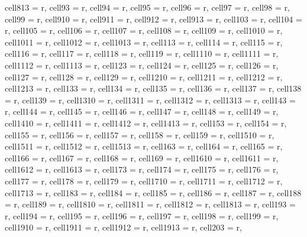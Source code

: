 \documentclass[journal]{IEEEtran}
\begin{document}
\begin{table}
\begin{adjustbox}{width=\textwidth}
\begin{tblr}
{  cell{8}{13} = {r},
  cell{9}{3} = {r},
  cell{9}{4} = {r},
  cell{9}{5} = {r},
  cell{9}{6} = {r},
  cell{9}{7} = {r},
  cell{9}{8} = {r},
  cell{9}{9} = {r},
  cell{9}{10} = {r},
  cell{9}{11} = {r},
  cell{9}{12} = {r},
  cell{9}{13} = {r},
  cell{10}{3} = {r},
  cell{10}{4} = {r},
  cell{10}{5} = {r},
  cell{10}{6} = {r},
  cell{10}{7} = {r},
  cell{10}{8} = {r},
  cell{10}{9} = {r},
  cell{10}{10} = {r},
  cell{10}{11} = {r},
  cell{10}{12} = {r},
  cell{10}{13} = {r},
  cell{11}{3} = {r},
  cell{11}{4} = {r},
  cell{11}{5} = {r},
  cell{11}{6} = {r},
  cell{11}{7} = {r},
  cell{11}{8} = {r},
  cell{11}{9} = {r},
  cell{11}{10} = {r},
  cell{11}{11} = {r},
  cell{11}{12} = {r},
  cell{11}{13} = {r},
  cell{12}{3} = {r},
  cell{12}{4} = {r},
  cell{12}{5} = {r},
  cell{12}{6} = {r},
  cell{12}{7} = {r},
  cell{12}{8} = {r},
  cell{12}{9} = {r},
  cell{12}{10} = {r},
  cell{12}{11} = {r},
  cell{12}{12} = {r},
  cell{12}{13} = {r},
  cell{13}{3} = {r},
  cell{13}{4} = {r},
  cell{13}{5} = {r},
  cell{13}{6} = {r},
  cell{13}{7} = {r},
  cell{13}{8} = {r},
  cell{13}{9} = {r},
  cell{13}{10} = {r},
  cell{13}{11} = {r},
  cell{13}{12} = {r},
  cell{13}{13} = {r},
  cell{14}{3} = {r},
  cell{14}{4} = {r},
  cell{14}{5} = {r},
  cell{14}{6} = {r},
  cell{14}{7} = {r},
  cell{14}{8} = {r},
  cell{14}{9} = {r},
  cell{14}{10} = {r},
  cell{14}{11} = {r},
  cell{14}{12} = {r},
  cell{14}{13} = {r},
  cell{15}{3} = {r},
  cell{15}{4} = {r},
  cell{15}{5} = {r},
  cell{15}{6} = {r},
  cell{15}{7} = {r},
  cell{15}{8} = {r},
  cell{15}{9} = {r},
  cell{15}{10} = {r},
  cell{15}{11} = {r},
  cell{15}{12} = {r},
  cell{15}{13} = {r},
  cell{16}{3} = {r},
  cell{16}{4} = {r},
  cell{16}{5} = {r},
  cell{16}{6} = {r},
  cell{16}{7} = {r},
  cell{16}{8} = {r},
  cell{16}{9} = {r},
  cell{16}{10} = {r},
  cell{16}{11} = {r},
  cell{16}{12} = {r},
  cell{16}{13} = {r},
  cell{17}{3} = {r},
  cell{17}{4} = {r},
  cell{17}{5} = {r},
  cell{17}{6} = {r},
  cell{17}{7} = {r},
  cell{17}{8} = {r},
  cell{17}{9} = {r},
  cell{17}{10} = {r},
  cell{17}{11} = {r},
  cell{17}{12} = {r},
  cell{17}{13} = {r},
  cell{18}{3} = {r},
  cell{18}{4} = {r},
  cell{18}{5} = {r},
  cell{18}{6} = {r},
  cell{18}{7} = {r},
  cell{18}{8} = {r},
  cell{18}{9} = {r},
  cell{18}{10} = {r},
  cell{18}{11} = {r},
  cell{18}{12} = {r},
  cell{18}{13} = {r},
  cell{19}{3} = {r},
  cell{19}{4} = {r},
  cell{19}{5} = {r},
  cell{19}{6} = {r},
  cell{19}{7} = {r},
  cell{19}{8} = {r},
  cell{19}{9} = {r},
  cell{19}{10} = {r},
  cell{19}{11} = {r},
  cell{19}{12} = {r},
  cell{19}{13} = {r},
  cell{20}{3} = {r},
}
\end{tblr}
\end{adjustbox}
\end{table}
\end{document}
